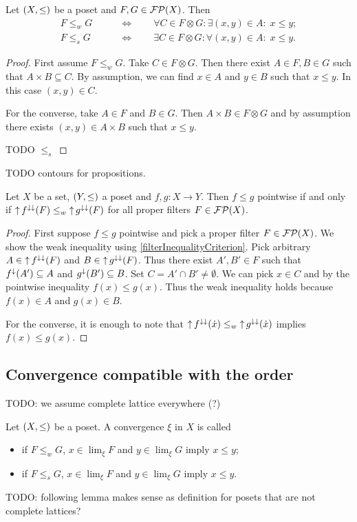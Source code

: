 \begin{lemma}
Let $\left( X,\leq \right)$ be a poset and $F,G\in\operatorname{\mathcal{FP}}(X)$. Then
\begin{align*}
F \leq_w G \qquad &\iff\qquad \forall C\in F\otimes G: \exists (x,y) \in A: \; x \leq y; \\
F \leq_s G \qquad &\iff\qquad \exists C\in F\otimes G: \forall (x,y) \in A: \; x \leq y.
\end{align*}
\end{lemma}
\begin{proof}
First assume $F\leq_w G$. Take $C\in F\otimes G$. Then there exist $A\in F, B\in G$ such that $A\times B \subseteq C$. By assumption, we can find $x\in A$ and $y\in B$ such that $x\leq y$. In this case $(x,y)\in C$.

For the converse, take $A\in F$ and $B\in G$. Then $A\times B\in F\otimes G$ and by assumption there exists $(x,y)\in A\times B$ such that $x\leq y$.

TODO $\leq_s$
\end{proof}
TODO contours for propositions.

\begin{proposition} \label{pointwisefunctionToFilterInequality}
Let $X$ be a set, $\left( Y,\leq \right)$ a poset and $f,g: X\to Y$. Then $f\leq g$ pointwise \textup{if and only if} $\operatorname{\uparrow} f^{\downarrow\downarrow}(F) \leq_w \operatorname{\uparrow} g^{\downarrow\downarrow}(F)$ for all proper filters $F\in \operatorname{\mathcal{FP}}(X)$.
\end{proposition}
\begin{proof}
First suppose $f\leq g$ pointwise and pick a proper filter $F\in \operatorname{\mathcal{FP}}(X)$. We show the weak inequality using \ref{filterInequalityCriterion}. Pick arbitrary $A\in \operatorname{\uparrow} f^{\downarrow\downarrow}(F)$ and $B\in \operatorname{\uparrow} g^{\downarrow\downarrow}(F)$. Thus there exist $A',B'\in F$ such that $f^{\downarrow}(A')\subseteq A$ and $g^{\downarrow}(B')\subseteq B$. Set $C = A'\cap B' \neq \emptyset$. We can pick $x\in C$ and by the pointwise inequality $f(x) \leq g(x)$. Thus the weak inequality holds because $f(x)\in A$ and $g(x)\in B$.

For the converse, it is enough to note that $\operatorname{\uparrow} f^{\downarrow\downarrow}(\dot{x}) \leq_w \operatorname{\uparrow} g^{\downarrow\downarrow}(\dot{x})$ implies $f(x)\leq g(x)$.
\end{proof}

\subsection{Convergence compatible with the order}
TODO: we assume complete lattice everywhere (?)
\begin{definition}
Let $\left( X,\leq \right)$ be a poset. A convergence $\xi$ in $X$ is called
\begin{itemize}
\item {} if $F \leq_w G$, $x\in\lim_\xi F$ and $y\in \lim_\xi G$ imply $x\leq y$;
\item {} if $F \leq_s G$, $x\in\lim_\xi F$ and $y\in \lim_\xi G$ imply $x\leq y$.
\end{itemize}
\end{definition}
TODO: following lemma makes sense as definition for posets that are not complete lattices?

